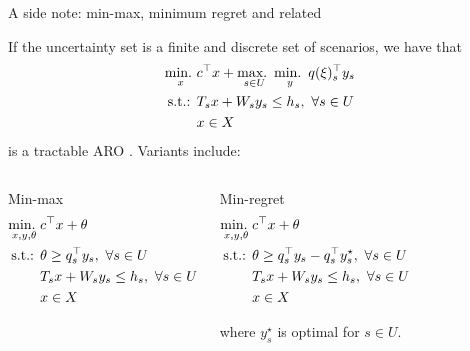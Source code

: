 \begin{frame}{A side note: min-max, minimum regret and related}

If the uncertainty set is a finite and discrete set of scenarios, we have that 
%
\begin{align*}
	\mathop{\text{min.} \ }_x & c^\top x + \mathop{\text{max.} \ }_{s \in U} \mathop{\text{min.} \ }_{y}q(\xi)_s^\top y_s \\
	\text{s.t.: } & T_sx + W_s y_s \le h_s, \ \forall s \in U \\
	& x \in X
\end{align*}
%
is a \alert{tractable} ARO \cite{mulvey1995robust}. \pause Variants include:

\vspace{-12pt}
\begin{columns}
	\begin{block}{Min-max}
	\vspace{-18pt} 
		\begin{align*}
			\mathop{\text{min.} \ }_{x,y,\theta} & c^\top x + \theta \\
			\text{s.t.: } & \theta \ge q_s^\top y_s, \ \forall s \in U \\
			& T_s x + W_s y_s \le h_s, \ \forall s \in U \\
			& x \in X
		\end{align*}
	\end{block}	
		\begin{block}{Min-regret}
	\vspace{-18pt} 
		\begin{align*}
			\mathop{\text{min.} \ }_{x,y,\theta} & c^\top x + \theta \\
			\text{s.t.: } & \theta \ge q_s^\top y_s - q_s^\top y^\star_s, \ \forall s \in U \\
			& T_sx + W_s y_s \le h_s, \ \forall s \in U \\
			& x \in X
		\end{align*}
		
		\vspace{-12pt}
		where $y^\star_s$ is optimal for $s \in U$.
	\end{block}	
\end{columns}
	
\end{frame}


